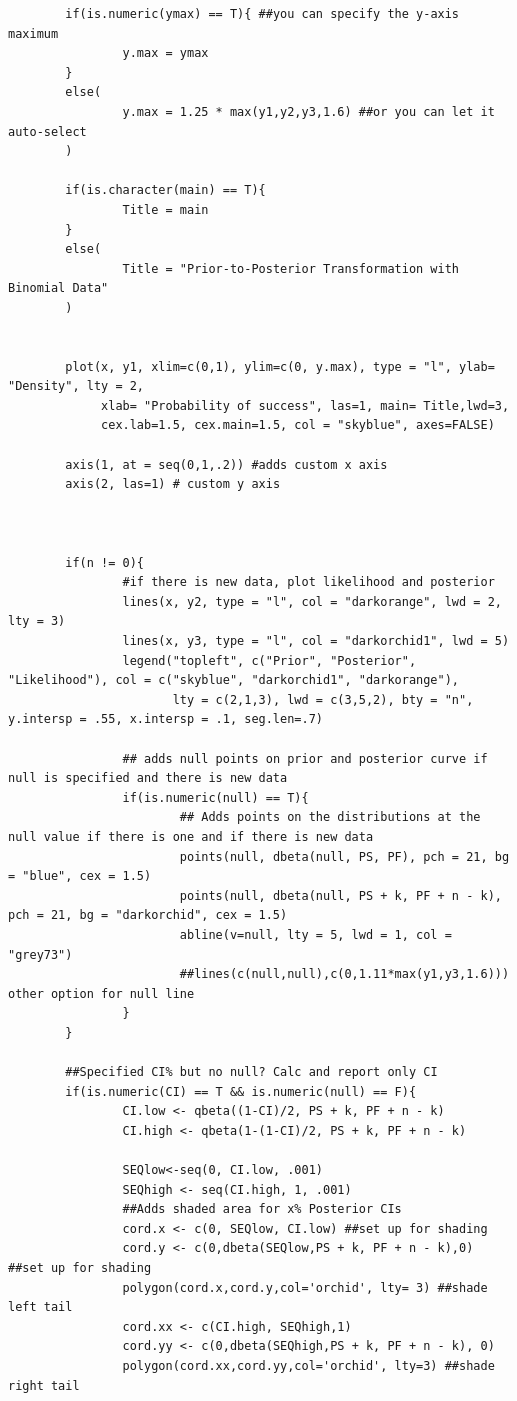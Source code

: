 \begin{lstlisting}
        if(is.numeric(ymax) == T){ ##you can specify the y-axis maximum
                y.max = ymax
        }        
        else(
                y.max = 1.25 * max(y1,y2,y3,1.6) ##or you can let it auto-select
        )
        
        if(is.character(main) == T){
                Title = main
        }
        else(
                Title = "Prior-to-Posterior Transformation with Binomial Data"
        )
        
        
        plot(x, y1, xlim=c(0,1), ylim=c(0, y.max), type = "l", ylab= "Density", lty = 2,
             xlab= "Probability of success", las=1, main= Title,lwd=3,
             cex.lab=1.5, cex.main=1.5, col = "skyblue", axes=FALSE)
        
        axis(1, at = seq(0,1,.2)) #adds custom x axis
        axis(2, las=1) # custom y axis
        
        
        
        if(n != 0){
                #if there is new data, plot likelihood and posterior
                lines(x, y2, type = "l", col = "darkorange", lwd = 2, lty = 3)
                lines(x, y3, type = "l", col = "darkorchid1", lwd = 5)
                legend("topleft", c("Prior", "Posterior", "Likelihood"), col = c("skyblue", "darkorchid1", "darkorange"), 
                       lty = c(2,1,3), lwd = c(3,5,2), bty = "n", y.intersp = .55, x.intersp = .1, seg.len=.7)
                
                ## adds null points on prior and posterior curve if null is specified and there is new data
                if(is.numeric(null) == T){
                        ## Adds points on the distributions at the null value if there is one and if there is new data
                        points(null, dbeta(null, PS, PF), pch = 21, bg = "blue", cex = 1.5)
                        points(null, dbeta(null, PS + k, PF + n - k), pch = 21, bg = "darkorchid", cex = 1.5)
                        abline(v=null, lty = 5, lwd = 1, col = "grey73")
                        ##lines(c(null,null),c(0,1.11*max(y1,y3,1.6))) other option for null line
                }
        }
        
        ##Specified CI% but no null? Calc and report only CI
        if(is.numeric(CI) == T && is.numeric(null) == F){
                CI.low <- qbeta((1-CI)/2, PS + k, PF + n - k)
                CI.high <- qbeta(1-(1-CI)/2, PS + k, PF + n - k)
                
                SEQlow<-seq(0, CI.low, .001)
                SEQhigh <- seq(CI.high, 1, .001)
                ##Adds shaded area for x% Posterior CIs
                cord.x <- c(0, SEQlow, CI.low) ##set up for shading
                cord.y <- c(0,dbeta(SEQlow,PS + k, PF + n - k),0) ##set up for shading
                polygon(cord.x,cord.y,col='orchid', lty= 3) ##shade left tail
                cord.xx <- c(CI.high, SEQhigh,1) 
                cord.yy <- c(0,dbeta(SEQhigh,PS + k, PF + n - k), 0)
                polygon(cord.xx,cord.yy,col='orchid', lty=3) ##shade right tail
                

\end{lstlisting}

